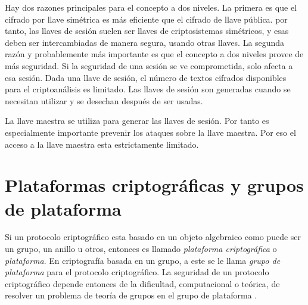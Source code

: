 \documentclass[12pt]{book}
\theoremstyle{definition}
\begin{document}
Hay dos razones principales para el concepto a dos niveles. La primera es que el cifrado por llave simétrica es más eficiente que el cifrado de llave pública. por tanto, las llaves de sesión suelen ser llaves de criptosistemas simétricos, y esas deben ser intercambiadas de manera segura, usando otras llaves. La segunda razón y probablemente más importante es que el concepto a dos niveles provee de más seguridad. Si la seguridad de una sesión se ve comprometida, solo afecta a esa sesión. Dada una llave de sesión, el número de textos cifrados disponibles para el criptoanálisis es limitado. Las llaves de sesión son generadas cuando se necesitan utilizar y se desechan después de ser usadas.

La llave maestra se utiliza para generar las llaves de sesión. Por tanto es especialmente importante prevenir los ataques sobre la llave maestra. Por eso el acceso a la llave maestra esta estrictamente limitado.





















\section{Plataformas criptográficas y grupos de plataforma}

Si un protocolo criptográfico esta basado en un objeto algebraico como puede ser un grupo, un anillo u otros, entonces es llamado \textit{plataforma criptográfica} o \textit{plataforma}. En criptografía basada en un grupo, a este se le llama \textit{grupo de plataforma} para el protocolo criptográfico. La seguridad de un protocolo criptográfico depende entonces de la dificultad, computacional o teórica, de resolver un problema de teoría de grupos en el grupo de plataforma \cite{co_ma}.
\end{document}
